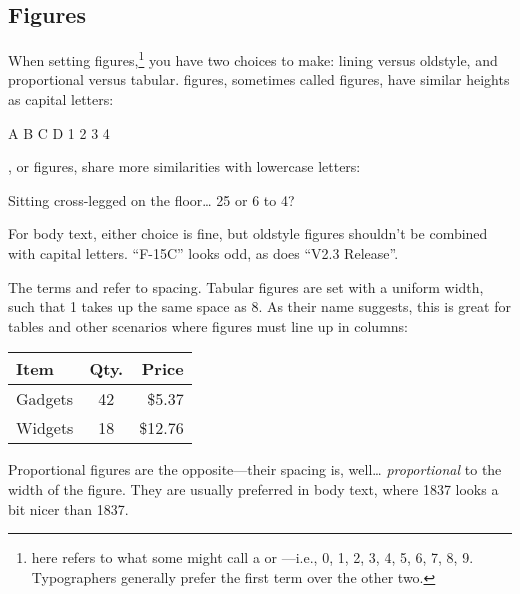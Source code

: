 \subsection{Figures}

When setting figures,\punckern\footnote{
here refers to what some might call a  or
---i.e., 0, 1, 2, 3, 4, 5, 6, 7, 8, 9.
Typographers generally prefer the first term over the other two.}
you have two
choices to make: lining versus oldstyle,
and proportional versus tabular.
 figures, sometimes called  figures,
have similar heights as capital letters:
\begin{leftfigure}
A B C D 1 2 3 4
\end{leftfigure}
, or  figures,
share more similarities with lowercase letters:
\begin{leftfigure}
Sitting cross-legged on the floor\dots{} 25 or 6 to 4?
\end{leftfigure}
For body text, either choice is fine, but oldstyle figures shouldn't
be combined with capital letters.
``F-15C'' looks odd, as does ``V2.3 Release''\quotekern.

{
The terms  and  refer to spacing.
Tabular figures are set with a uniform width, such that 1 takes up
the same space as 8.
As their name suggests, this is great for tables and other scenarios
where figures must line up in columns:}
\begin{leftfigure}
\begin{tabular}{l|c r}
Item & Qty. & Price \\
\hline
Gadgets & 42 & \$5.37 \\
Widgets & 18 & \$12.76 \\
\end{tabular}
\end{leftfigure}
Proportional figures are the opposite---their spacing is, well\dots{}
\emph{proportional} to the width of the figure.
They are usually preferred in body text, where 1837
looks a bit nicer than
{1837}.

